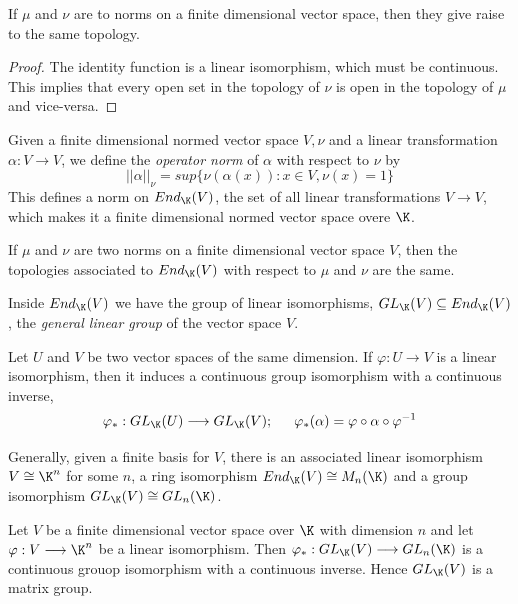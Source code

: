 \begin{corollary}
  If \(\mu\) and \(\nu\) are to norms on a finite dimensional vector space, then they give
  raise to the same topology.
\end{corollary}

\begin{proof}
  The identity function is a linear isomorphism, which must be continuous. This implies that
  every open set in the topology of \(\nu\) is open in the topology of \(\mu\) and vice-versa.
\end{proof}

Given a finite dimensional normed vector space \(V,\nu\) and a linear transformation
\(\alpha:V\longrightarrow V\), we define the {\it operator norm} of \(\alpha\) with respect to
\(\nu\) by
\[ ||\alpha||_{\nu}=sup\{\nu(\alpha(x)):x\in V,\nu(x)=1\} \]
This defines a norm on \(End_{\K}(V)\), the set of all linear transformations \(V\longrightarrow V\),
which makes it a finite dimensional normed vector space overe \(\K\).

\begin{proposition}
  If \(\mu\) and \(\nu\) are two norms on a finite dimensional vector space \(V\), then the
  topologies associated to \(End_{\K}(V)\) with respect to \(\mu\) and \(\nu\) are the same.
\end{proposition}

Inside \(End_{\K}(V)\) we have the group of linear isomorphisms, \(GL_{\K}(V)\subseteq End_{\K}(V)\),
the {\it general linear group} of the vector space \(V\).

\begin{proposition}
  Let \(U\) and \(V\) be two vector spaces of the same dimension. If \(\varphi:U\longrightarrow V\)
  is a linear isomorphism, then it induces a continuous group isomorphism with a continuous inverse,
  \[ \varphi_*:GL_{\K}(U)\longrightarrow GL_{\K}(V);\hspace{15px} \varphi_*(\alpha)=\varphi\circ\alpha\circ\varphi^{-1} \]
\end{proposition}

Generally, given a finite basis for \(V\), there is an associated linear isomorphism
\(V\cong\K^n\) for some \(n\), a ring isomorphism \(End_{\K}(V)\cong M_n(\K)\) and a group
isomorphism \(GL_{\K}(V)\cong GL_n(\K)\).

\begin{theorem}
  Let \(V\) be a finite dimensional vector space over \(\K\) with dimension \(n\) and let
  \(\varphi:V\longrightarrow\K^n\) be a linear isomorphism. Then \(\varphi_*:GL_{\K}(V)\longrightarrow GL_n(\K)\)
  is a continuous grouop isomorphism with a continuous inverse. Hence \(GL_{\K}(V)\) is a
  matrix group.
\end{theorem}

